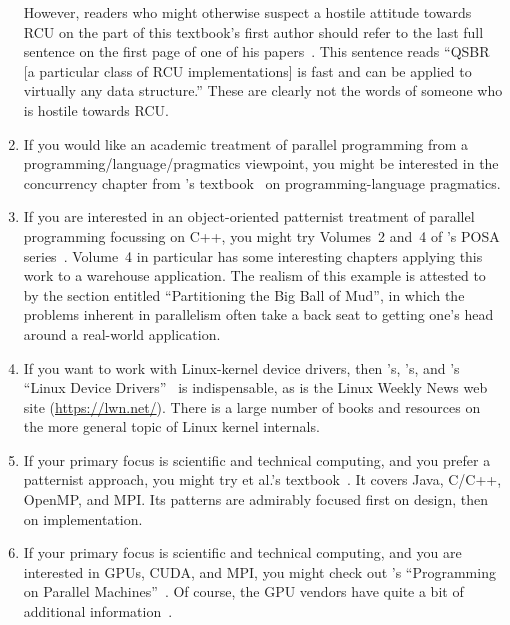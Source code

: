 \begin{enumerate}
	However, readers who might otherwise suspect a hostile attitude
	towards RCU on the part of this textbook's first author should
	refer to the last full sentence on the first page of one of his
	papers~\cite{Balmau:2016:FRM:2935764.2935790}.
	This sentence reads ``QSBR [a particular class of RCU
	implementations] is fast and can be applied to virtually any
	data structure.''
	These are clearly not the words of someone who is hostile
	towards RCU.
\item	If you would like an academic treatment of parallel
	programming from a programming\-/language\-/pragmatics viewpoint,
	you might be interested in the concurrency chapter from
	's
	textbook~\cite{MichaelScott2006Textbook,MichaelScott2015Textbook}
	on programming-language pragmatics.
\item	If you are interested in an object-oriented patternist
	treatment of parallel programming focussing on C++,
	you might try Volumes~2 and~4 of 's POSA
	series~\cite{SchmidtStalRohnertBuschmann2000v2Textbook,
	BuschmannHenneySchmidt2007v4Textbook}.
	Volume~4 in particular has some interesting chapters
	applying this work to a warehouse application.
	The realism of this example is attested to by
	the section entitled ``Partitioning the Big Ball of Mud'',
	in which the problems inherent in parallelism often take a back
	seat to getting one's head around a real-world application.
\item	If you want to work with Linux-kernel device drivers,
	then 's, 's,
	and 's
	``Linux Device Drivers''~\cite{CorbetRubiniKroahHartman}
	is indispensable, as is the Linux Weekly News web site
	(\url{https://lwn.net/}).
	There is a large number of books and resources on
	the more general topic of Linux kernel internals.
\item	If your primary focus is scientific and technical computing,
	and you prefer a patternist approach,
	you might try  et al.'s
	textbook~\cite{Mattson2005Textbook}.
	It covers Java, C/C++, OpenMP, and MPI\@.
	Its patterns are admirably focused first on design,
	then on implementation.
\item	If your primary focus is scientific and technical computing,
	and you are interested in GPUs, CUDA, and MPI, you
	might check out 's ``Programming on
	Parallel Machines''~\cite{NormMatloff2017ParProcBook}.
	Of course, the GPU vendors have quite a bit of additional
	information~\cite{AMD2020ROCm,CyrilZeller2011GPGPUbasics,NVidia2017GPGPU,NVidia2017GPGPU-university}.

\end{enumerate}
